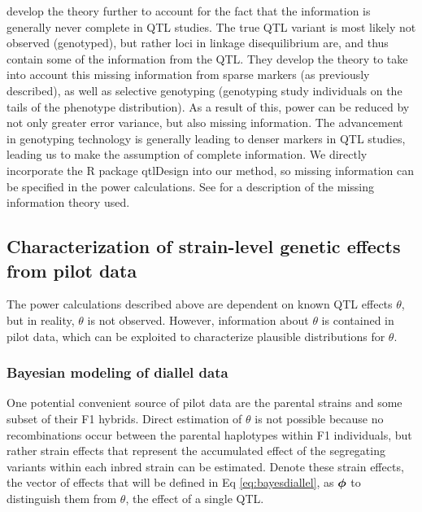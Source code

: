 \cite{Sen2005} develop the theory further to account for the fact that the information is generally never complete in QTL studies. The true QTL variant is most likely not observed (genotyped), but rather loci in linkage disequilibrium are, and thus contain some of the information from the QTL. They develop the theory to take into account this missing information from sparse markers (as previously described), as well as selective genotyping (genotyping study individuals on the tails of the phenotype distribution). As a result of this, power can be reduced by not only greater error variance, but also missing information. The advancement in genotyping technology is generally leading to denser markers in QTL studies, leading us to make the assumption of complete information. We directly incorporate the R package qtlDesign \citep{Sen2007} into our method, so missing information can be specified in the power calculations. See \cite{Sen2005} for a description of the missing information theory used.  


\subsection{Characterization of strain-level genetic effects from pilot data}

The power calculations described above are dependent on known QTL effects $\theta$, but in reality, $\theta$ is not observed. However, information about $\theta$ is contained in pilot data, which can be exploited to characterize plausible distributions for $\theta$. 

\subsubsection{Bayesian modeling of diallel data}

One potential convenient source of pilot data are the parental strains and some subset of their F1 hybrids. Direct estimation of $\theta$ is not possible because no recombinations occur between the parental haplotypes within F1 individuals, but rather strain effects that represent the accumulated effect of the segregating variants within each inbred strain can be estimated. Denote these strain effects, the vector of effects that will be defined in Eq \ref{eq:bayesdiallel}, as $\boldsymbol{\phi}$ to distinguish them from $\theta$, the effect of a single QTL. 


